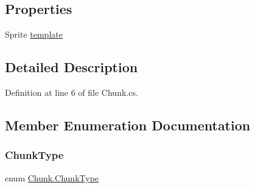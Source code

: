 \subsection*{Properties}
\begin{DoxyCompactItemize}
\item 
Sprite \mbox{\hyperlink{class_chunk_a90851ff2883364a1e00753d1fd35461b}{template}}
\end{DoxyCompactItemize}


\subsection{Detailed Description}


Definition at line 6 of file Chunk.\+cs.



\subsection{Member Enumeration Documentation}
\mbox{\label{class_chunk_ab2e9c44541a726c19e8f0afbcf82894c}} 
\subsubsection{\texorpdfstring{ChunkType}{ChunkType}}
{\footnotesize\ttfamily enum \mbox{\hyperlink{class_chunk_ab2e9c44541a726c19e8f0afbcf82894c}{Chunk.\+Chunk\+Type}}\hspace{0.3cm}{\ttfamily [strong]}}

